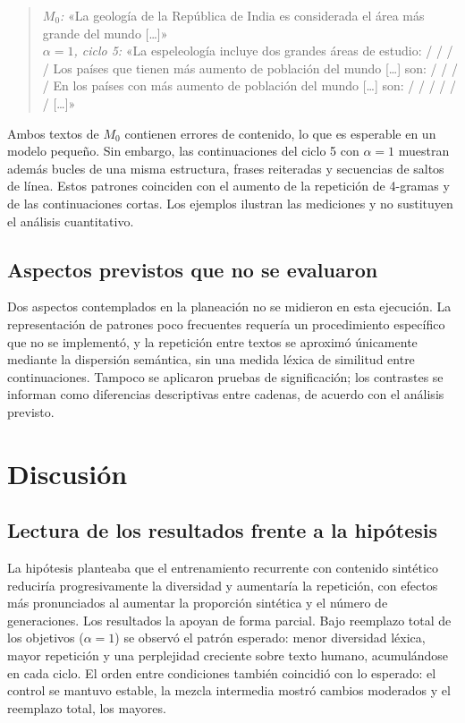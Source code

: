 \documentclass[12pt,letterpaper]{article}
\begin{document}
\begin{quote}\small
\textit{\(M_0\):} «La geología de la República de India es considerada el
área más grande del mundo [\ldots]»\\[0.3em]
\textit{\(\alpha=1\), ciclo 5:} «La espeleología incluye dos grandes áreas
de estudio: / / / / Los países que tienen más aumento de población del mundo
[\ldots] son: / / / / En los países con más aumento de población del mundo
[\ldots] son: / / / / / / [\ldots]»
\end{quote}

Ambos textos de \(M_0\) contienen errores de contenido, lo que es esperable
en un modelo pequeño. Sin embargo, las continuaciones del ciclo 5 con
\(\alpha=1\) muestran además bucles de una misma estructura, frases
reiteradas y secuencias de saltos de línea. Estos patrones coinciden con
el aumento de la repetición de 4-gramas y de las continuaciones cortas.
Los ejemplos ilustran las mediciones y no sustituyen el análisis
cuantitativo.

\subsection{Aspectos previstos que no se evaluaron}

Dos aspectos contemplados en la planeación no se midieron en esta
ejecución. La representación de patrones poco frecuentes requería un
procedimiento específico que no se implementó, y la repetición entre
textos se aproximó únicamente mediante la dispersión semántica, sin una
medida léxica de similitud entre continuaciones. Tampoco se aplicaron
pruebas de significación; los contrastes se informan como diferencias
descriptivas entre cadenas, de acuerdo con el análisis previsto.

\section{Discusión}

\subsection{Lectura de los resultados frente a la hipótesis}

La hipótesis planteaba que el entrenamiento recurrente con contenido
sintético reduciría progresivamente la diversidad y aumentaría la
repetición, con efectos más pronunciados al aumentar la proporción
sintética y el número de generaciones. Los resultados la apoyan de forma
parcial. Bajo reemplazo total de los objetivos (\(\alpha=1\)) se observó el
patrón esperado: menor diversidad léxica, mayor repetición y una
perplejidad creciente sobre texto humano, acumulándose en cada ciclo.
El orden entre condiciones también coincidió con lo esperado: el control
se mantuvo estable, la mezcla intermedia mostró cambios moderados y el
reemplazo total, los mayores.
\end{document}
